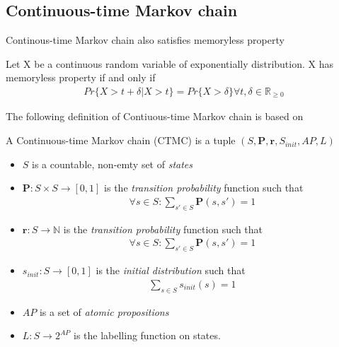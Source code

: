 \subsection{Continuous-time Markov chain}
Continous-time Markov chain also satisfies memoryless property
\begin{definition}
    Let X be a continuous random variable of exponentially distribution. X has memoryless property if and only if
    \begin{align*}
        Pr\{X > t + \delta | X > t\} = Pr\{X > \delta\} \forall t,\delta\in\mathbb{R}_{\geq 0}
    \end{align*}
\end{definition}

The following definition of Contiuous-time Markov chain is based on \cite{baier2003model}
\begin{definition}
    A Continuous-time Markov chain (CTMC) is a tuple $(S,\mathbf{P}, \mathbf{r}, S_{init}, AP, L)$ \cite{baier2003model}
    \begin{itemize}
        \item $S$ is a countable, non-emty set of \textit{states}
        \item $\mathbf{P}:S\times S \rightarrow [0,1]$ is the \textit{transition probability}
              function such that
              \begin{align*}
                  \forall s \in S : \sum_{s'\in S}\mathbf{P}(s, s') = 1
              \end{align*}
        \item $\mathbf{r}:S \rightarrow \mathbb{N}$ is the \textit{transition probability}
              function such that
              \begin{align*}
                  \forall s \in S : \sum_{s'\in S}\mathbf{P}(s, s') = 1
              \end{align*}
        \item $s_{init}: S \rightarrow [0,1]$ is the \textit{initial distribution} such that
              \begin{align*}
                  \sum_{s\in S}s_{init}(s) = 1
              \end{align*}
        \item $AP$ is a set of \textit{atomic propositions}
        \item $L: S \rightarrow 2^{AP}$ is the labelling function on states.
    \end{itemize}
\end{definition}



